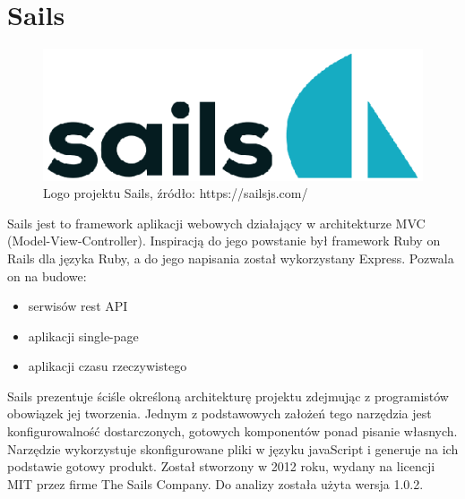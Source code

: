 \documentclass[12pt]{report}
\begin{document}
   \section{Sails}
    \begin{figure}[!hb]
      \centering
      \includegraphics[width=\textwidth,height=\textheight,keepaspectratio]{logo_sails.png} 
      \caption{Logo projektu Sails, źródło: https://sailsjs.com/}
    \end{figure}
    Sails jest to framework aplikacji webowych działający w architekturze MVC (Model-View-Controller).
    Inspiracją do jego powstanie był framework Ruby on Rails dla języka Ruby, a do jego napisania został wykorzystany Express.
    Pozwala on na budowe:
     \begin{itemize}
      \item serwisów rest API
      \item aplikacji single-page 
      \item aplikacji czasu rzeczywistego
    \end{itemize} 
    Sails prezentuje ściśle określoną architekturę projektu zdejmując z programistów obowiązek jej tworzenia.
    Jednym z podstawowych założeń tego narzędzia jest konfigurowalność dostarczonych, gotowych komponentów ponad pisanie własnych.
    Narzędzie wykorzystuje skonfigurowane pliki w języku javaScript i generuje na ich podstawie gotowy produkt.
    Został stworzony w 2012 roku, wydany na licencji MIT przez firme The Sails Company.
    Do analizy została użyta wersja 1.0.2.
\end{document}
